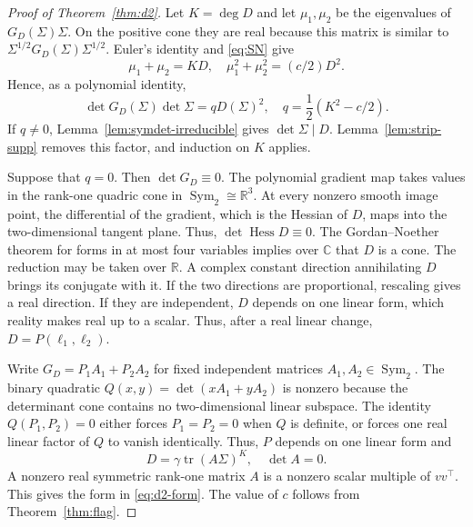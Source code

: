 \documentclass[12pt,a4paper]{article}
\theoremstyle{plain}
\theoremstyle{definition}
\newcommand{\C}{\mathbb{C}}
\newcommand{\R}{\mathbb{R}}
\newcommand{\Sym}{\operatorname{Sym}}
\newcommand{\tr}{\operatorname{tr}}
\newcommand{\Hess}{\operatorname{Hess}}
\begin{document}
\begin{proof}[Proof of Theorem~\ref{thm:d2}]
    Let $K=\deg D$ and let $\mu_1,\mu_2$ be the eigenvalues of $G_D(\Sigma)\Sigma$.
    On the positive cone they are real because this matrix is similar to $\Sigma^{1/2}G_D(\Sigma)\Sigma^{1/2}$.
    Euler's identity and \eqref{eq:SN} give
    \begin{equation*}
        \mu_1+\mu_2
        =
        KD
        ,
        \quad
        \mu_1^2+\mu_2^2
        =
        (c/2)D^2
        .
    \end{equation*}
    Hence, as a polynomial identity,
    \begin{equation}
    \label{eq:d2det}
        \det G_D(\Sigma)\det\Sigma
        =
        qD(\Sigma)^2
        ,
        \quad
        q
        =
        \frac{1}{2}(K^2-c/2)
        .
    \end{equation}
    If $q\ne0$, Lemma~\ref{lem:symdet-irreducible} gives $\det\Sigma\mid D$.
    Lemma~\ref{lem:strip-supp} removes this factor, and induction on $K$ applies.

    Suppose that $q=0$.
    Then $\det G_D\equiv0$.
    The polynomial gradient map takes values in the rank-one quadric cone in $\Sym_2\cong\R^3$.
    At every nonzero smooth image point, the differential of the gradient, which is the Hessian of $D$, maps into the two-dimensional tangent plane.
    Thus, $\det\Hess D\equiv0$.
    The Gordan--Noether theorem for forms in at most four variables implies over $\C$ that $D$ is a cone.
    The reduction may be taken over $\R$.
    A complex constant direction annihilating $D$ brings its conjugate with it.
    If the two directions are proportional, rescaling gives a real direction.
    If they are independent, $D$ depends on one linear form, which reality makes real up to a scalar.
    Thus, after a real linear change, $D=P(\ell_1,\ell_2)$.

    Write $G_D=P_1A_1+P_2A_2$ for fixed independent matrices $A_1,A_2\in\Sym_2$.
    The binary quadratic $Q(x,y)=\det(xA_1+yA_2)$ is nonzero because the determinant cone contains no two-dimensional linear subspace.
    The identity $Q(P_1,P_2)=0$ either forces $P_1=P_2=0$ when $Q$ is definite, or forces one real linear factor of $Q$ to vanish identically.
    Thus, $P$ depends on one linear form and
    \begin{equation*}
        D
        =
        \gamma\tr(A\Sigma)^K
        ,
        \quad
        \det A=0
        .
    \end{equation*}
    A nonzero real symmetric rank-one matrix $A$ is a nonzero scalar multiple of $vv^\top$.
    This gives the form in \eqref{eq:d2-form}.
    The value of $c$ follows from Theorem~\ref{thm:flag}.
\end{proof}
\end{document}
